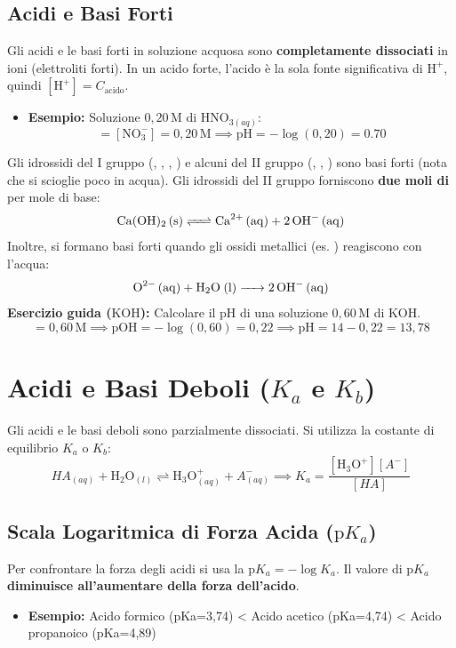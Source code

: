 \documentclass[11pt, a4paper, openright]{book}
\begin{document}
\subsection{Acidi e Basi Forti}
Gli acidi e le basi forti in soluzione acquosa sono \textbf{completamente dissociati} in ioni (elettroliti forti). In un acido forte, l'acido è la sola fonte significativa di $\text{H}^+$, quindi $[\text{H}^+] = C_{\text{acido}}$.
\begin{itemize}
    \item \textbf{Esempio:} Soluzione $0{,}20 \, \text{M}$ di $\text{HNO}_{3(aq)}$:
    \begin{equation}
    [\text{H}^+] = [\text{NO}_3^-] = 0{,}20 \, \text{M} \implies \text{pH} = -\log(0{,}20) = 0.70
    \end{equation}
\end{itemize}
Gli idrossidi del I gruppo (, , , ) e alcuni del II gruppo (, , ) sono basi forti (nota che  si scioglie poco in acqua). Gli idrossidi del II gruppo forniscono \textbf{due moli di } per mole di base:
\begin{equation}
\ce{Ca(OH)2 (s) <=> Ca^2+ (aq) + 2 OH- (aq)}
\end{equation}
Inoltre, si formano basi forti quando gli ossidi metallici (es. ) reagiscono con l'acqua:
\begin{equation}
\ce{O^2- (aq) + H2O (l) -> 2 OH- (aq)}
\end{equation}
\noindent\textbf{Esercizio guida ($\text{KOH}$):} Calcolare il pH di una soluzione $0{,}60 \, \text{M}$ di $\text{KOH}$.
\begin{equation}
[\text{OH}^-] = 0{,}60 \, \text{M} \implies \text{pOH} = -\log(0{,}60) = 0{,}22 \implies \text{pH} = 14 - 0{,}22 = 13{,}78
\end{equation}

\section[Acidi e Basi Deboli (Ka e Kb)]{Acidi e Basi Deboli ($K_a$ e $K_b$)}
Gli acidi e le basi deboli sono parzialmente dissociati. Si utilizza la costante di equilibrio $K_a$ o $K_b$:
\begin{equation}
HA_{(aq)} + \text{H}_2\text{O}_{(l)} \rightleftharpoons \text{H}_3\text{O}^+_{(aq)} + A^-_{(aq)} \implies K_a = \frac{[\text{H}_3\text{O}^+][A^-]}{[HA]}
\end{equation}
\subsection[Scala Logaritmica di Forza Acida (pKa)]{Scala Logaritmica di Forza Acida ($\text{p}K_a$)}
Per confrontare la forza degli acidi si usa la $\text{p}K_a = -\log K_a$. Il valore di $\text{p}K_a$ \textbf{diminuisce all'aumentare della forza dell'acido}.
\begin{itemize}
    \item \textbf{Esempio:} Acido formico (pKa=3,74) < Acido acetico (pKa=4,74) < Acido propanoico (pKa=4,89)
\end{itemize}
\end{document}

